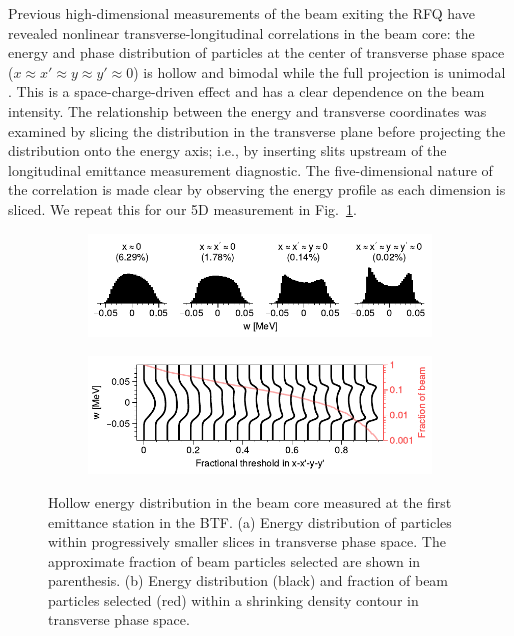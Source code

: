 \documentclass[letterpaper,
               keeplastbox,
               nospread,
               biblatex,
              ]{jacow}
\begin{document}
Previous high-dimensional measurements of the beam exiting the RFQ have revealed nonlinear transverse-longitudinal correlations in the beam core: the energy and phase distribution of particles at the center of transverse phase space ($x \approx x' \approx y \approx y' \approx 0$) is hollow and bimodal while the full projection is unimodal \cite{Cathey2018}. This is a space-charge-driven effect \cite{Ruisard2021-hollow} and has a clear dependence on the beam intensity. The relationship between the energy and transverse coordinates was examined by slicing the distribution in the transverse plane before projecting the distribution onto the energy axis; i.e., by inserting slits upstream of the longitudinal emittance measurement diagnostic. The five-dimensional nature of the correlation is made clear by observing the energy profile as each dimension is sliced. We repeat this for our 5D measurement in Fig.~\ref{fig:hollow_a}.
%
\begin{figure}[!t]
    \centering
    \begin{subfigure}{\columnwidth}
        \includegraphics[width=\textwidth]{fig3a.pdf}
        \caption{}
        \label{fig:hollow_a}
    \end{subfigure}
    \begin{subfigure}{\columnwidth}
        \includegraphics[width=\textwidth]{fig3b.pdf}
        \caption{}
        \label{fig:hollow_b}
    \end{subfigure}
    \caption{Hollow energy distribution in the beam core measured at the first emittance station in the BTF. (a) Energy distribution of particles within progressively smaller slices in transverse phase space. The approximate fraction of beam particles selected are shown in parenthesis. (b) Energy distribution (black) and fraction of beam particles selected (red) within a shrinking density contour in transverse phase space.}
    \label{fig:hollow}
\end{figure}
%
\end{document}
